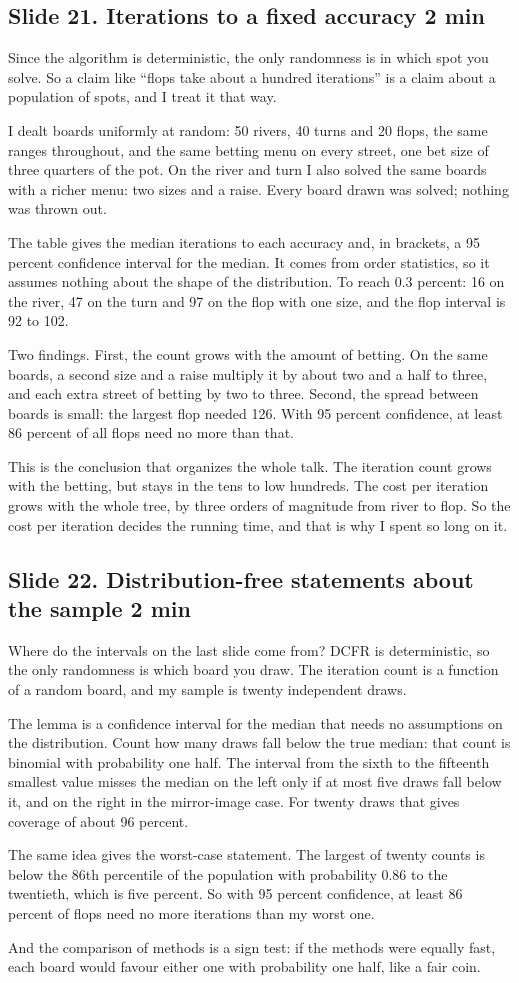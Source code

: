 \documentclass[11pt]{article}
\newcommand{\slidehead}[3]{\subsection*{Slide #1. #2 \hfill {\normalfont\small #3}}}
\begin{document}
\slidehead{21}{Iterations to a fixed accuracy}{2 min}
\begin{say}
Since the algorithm is deterministic, the only randomness is in which spot you solve. So a claim like ``flops
take about a hundred iterations'' is a claim about a population of spots, and I treat it that way.

I dealt boards uniformly at random: 50 rivers, 40 turns and 20 flops, the same ranges throughout, and the same
betting menu on every street, one bet size of three quarters of the pot. On the river and turn I also solved the
same boards with a richer menu: two sizes and a raise. Every board drawn was solved; nothing was thrown out.

The table gives the median iterations to each accuracy and, in brackets, a 95 percent confidence interval for the
median. It comes from order statistics, so it assumes nothing about the shape of the distribution. To reach 0.3
percent: 16 on the river, 47 on the turn and 97 on the flop with one size, and the flop interval is 92 to 102.

Two findings. First, the count grows with the amount of betting. On the same boards, a second size and a raise
multiply it by about two and a half to three, and each extra street of betting by two to three. Second, the
spread between boards is small: the largest flop needed 126. With 95 percent confidence, at least 86 percent of all
flops need no more than that.

This is the conclusion that organizes the whole talk. The iteration count grows with the betting, but stays in the
tens to low hundreds. The cost per iteration grows with the whole tree, by three orders of magnitude from river to
flop. So the cost per iteration decides the running time, and that is why I spent so long on it.
\end{say}

\slidehead{22}{Distribution-free statements about the sample}{2 min}
\begin{say}
Where do the intervals on the last slide come from? DCFR is deterministic, so the only randomness is which board you
draw. The iteration count is a function of a random board, and my sample is twenty independent draws.

The lemma is a confidence interval for the median that needs no assumptions on the distribution. Count how many
draws fall below the true median: that count is binomial with probability one half. The interval from the sixth to
the fifteenth smallest value misses the median on the left only if at most five draws fall below it, and on the
right in the mirror-image case. For twenty draws that gives coverage of about 96 percent.

The same idea gives the worst-case statement. The largest of twenty counts is below the 86th percentile of the
population with probability 0.86 to the twentieth, which is five percent. So with 95 percent confidence, at least 86
percent of flops need no more iterations than my worst one.

And the comparison of methods is a sign test: if the methods were equally fast, each board would favour either one
with probability one half, like a fair coin.
\end{say}
\end{document}
